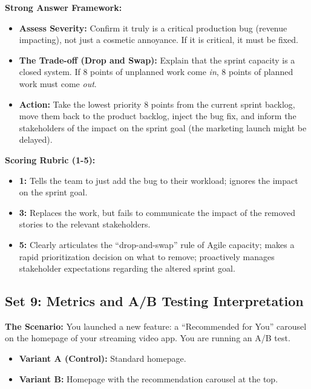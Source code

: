 \documentclass[
  11pt,
  openany,
  oneside]{book}
\providecommand{\tightlist}{%
  \setlength{\itemsep}{0pt}\setlength{\parskip}{0pt}}
\begin{document}
\textbf{Strong Answer Framework:}

\begin{itemize}
\tightlist
\item
  \textbf{Assess Severity:} Confirm it truly is a critical production
  bug (revenue impacting), not just a cosmetic annoyance. If it is
  critical, it must be fixed.
\item
  \textbf{The Trade-off (Drop and Swap):} Explain that the sprint
  capacity is a closed system. If 8 points of unplanned work come
  \emph{in}, 8 points of planned work must come \emph{out}.
\item
  \textbf{Action:} Take the lowest priority 8 points from the current
  sprint backlog, move them back to the product backlog, inject the bug
  fix, and inform the stakeholders of the impact on the sprint goal (the
  marketing launch might be delayed).
\end{itemize}

\textbf{Scoring Rubric (1-5):}

\begin{itemize}
\tightlist
\item
  \textbf{1:} Tells the team to just add the bug to their workload;
  ignores the impact on the sprint goal.
\item
  \textbf{3:} Replaces the work, but fails to communicate the impact of
  the removed stories to the relevant stakeholders.
\item
  \textbf{5:} Clearly articulates the ``drop-and-swap'' rule of Agile
  capacity; makes a rapid prioritization decision on what to remove;
  proactively manages stakeholder expectations regarding the altered
  sprint goal.
\end{itemize}

\bigskip

\subsection{Set 9: Metrics and A/B Testing
Interpretation}\label{set-9-metrics-and-ab-testing-interpretation}

\textbf{The Scenario:} You launched a new feature: a ``Recommended for
You'' carousel on the homepage of your streaming video app. You are
running an A/B test.

\begin{itemize}
\tightlist
\item
  \textbf{Variant A (Control):} Standard homepage.
\item
  \textbf{Variant B:} Homepage with the recommendation carousel at the
  top.
\end{itemize}
\end{document}
